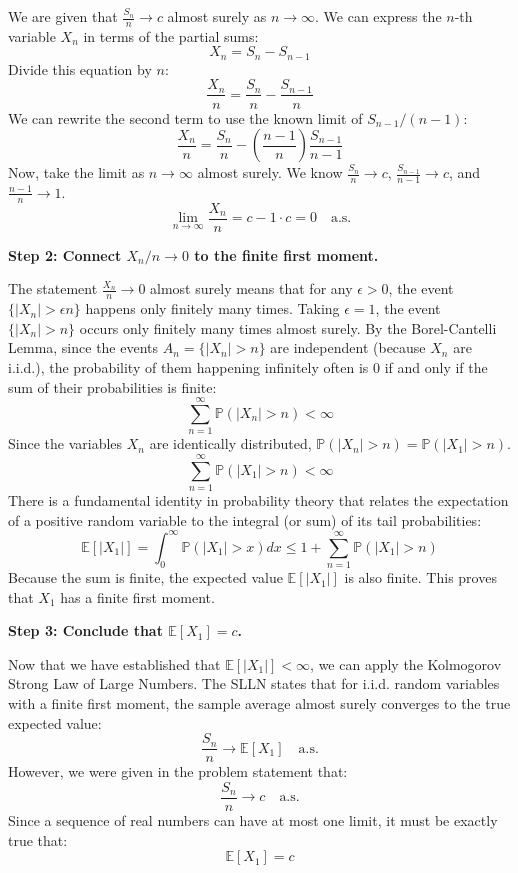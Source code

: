 \begin{solution}
We are given that $\frac{S_n}{n} \to c$ almost surely as $n \to \infty$.
We can express the $n$-th variable $X_n$ in terms of the partial sums:
\[ X_n = S_n - S_{n-1} \]
Divide this equation by $n$:
\[ \frac{X_n}{n} = \frac{S_n}{n} - \frac{S_{n-1}}{n} \]
We can rewrite the second term to use the known limit of $S_{n-1}/(n-1)$:
\[ \frac{X_n}{n} = \frac{S_n}{n} - \left( \frac{n-1}{n} \right) \frac{S_{n-1}}{n-1} \]
Now, take the limit as $n \to \infty$ almost surely. We know $\frac{S_n}{n} \to c$, $\frac{S_{n-1}}{n-1} \to c$, and $\frac{n-1}{n} \to 1$.
\[ \lim_{n \to \infty} \frac{X_n}{n} = c - 1 \cdot c = 0 \quad \text{a.s.} \]

\textbf{Step 2: Connect $X_n / n \to 0$ to the finite first moment.}

The statement $\frac{X_n}{n} \to 0$ almost surely means that for any $\epsilon > 0$, the event $\{|X_n| > \epsilon n\}$ happens only finitely many times.
Taking $\epsilon = 1$, the event $\{|X_n| > n\}$ occurs only finitely many times almost surely.
By the Borel-Cantelli Lemma, since the events $A_n = \{|X_n| > n\}$ are independent (because $X_n$ are i.i.d.), the probability of them happening infinitely often is 0 if and only if the sum of their probabilities is finite:
\[ \sum_{n=1}^\infty \mathbb{P}(|X_n| > n) < \infty \]
Since the variables $X_n$ are identically distributed, $\mathbb{P}(|X_n| > n) = \mathbb{P}(|X_1| > n)$.
\[ \sum_{n=1}^\infty \mathbb{P}(|X_1| > n) < \infty \]
There is a fundamental identity in probability theory that relates the expectation of a positive random variable to the integral (or sum) of its tail probabilities:
\[ \mathbb{E}[|X_1|] = \int_0^\infty \mathbb{P}(|X_1| > x) dx \leq 1 + \sum_{n=1}^\infty \mathbb{P}(|X_1| > n) \]
Because the sum is finite, the expected value $\mathbb{E}[|X_1|]$ is also finite. This proves that $X_1$ has a finite first moment.

\textbf{Step 3: Conclude that $\mathbb{E}[X_1] = c$.}

Now that we have established that $\mathbb{E}[|X_1|] < \infty$, we can apply the Kolmogorov Strong Law of Large Numbers.
The SLLN states that for i.i.d. random variables with a finite first moment, the sample average almost surely converges to the true expected value:
\[ \frac{S_n}{n} \to \mathbb{E}[X_1] \quad \text{a.s.} \]
However, we were given in the problem statement that:
\[ \frac{S_n}{n} \to c \quad \text{a.s.} \]
Since a sequence of real numbers can have at most one limit, it must be exactly true that:
\[ \mathbb{E}[X_1] = c \]
\end{solution}

